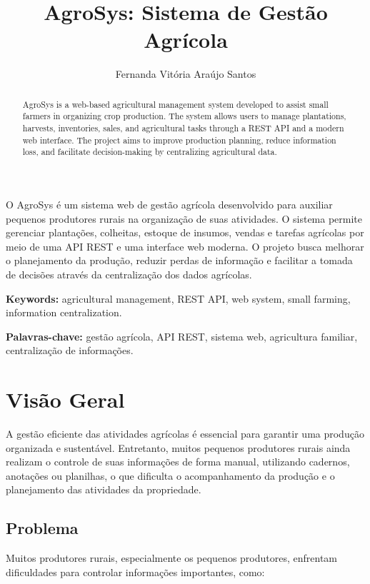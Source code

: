 \documentclass[12pt]{article}
\title{AgroSys: Sistema de Gestão Agrícola}
\author{Fernanda Vitória Araújo Santos}
\begin{document}
\maketitle

\begin{abstract}
  AgroSys is a web-based agricultural management system developed to assist small farmers in organizing crop production. The system allows users to manage plantations, harvests, inventories, sales, and agricultural tasks through a REST API and a modern web interface. The project aims to improve production planning, reduce information loss, and facilitate decision-making by centralizing agricultural data.
\end{abstract}

\begin{resumo}
  O AgroSys é um sistema web de gestão agrícola desenvolvido para auxiliar pequenos produtores rurais na organização de suas atividades. O sistema permite gerenciar plantações, colheitas, estoque de insumos, vendas e tarefas agrícolas por meio de uma API REST e uma interface web moderna. O projeto busca melhorar o planejamento da produção, reduzir perdas de informação e facilitar a tomada de decisões através da centralização dos dados agrícolas.
\end{resumo}

\noindent \textbf{Keywords:} agricultural management, REST API, web system, small farming, information centralization.

\noindent \textbf{Palavras-chave:} gestão agrícola, API REST, sistema web, agricultura familiar, centralização de informações.

\section{Visão Geral}

A gestão eficiente das atividades agrícolas é essencial para garantir uma produção organizada e sustentável. Entretanto, muitos pequenos produtores rurais ainda realizam o controle de suas informações de forma manual, utilizando cadernos, anotações ou planilhas, o que dificulta o acompanhamento da produção e o planejamento das atividades da propriedade.

\subsection{Problema}

Muitos produtores rurais, especialmente os pequenos produtores, enfrentam dificuldades para controlar informações importantes, como:
\end{document}
